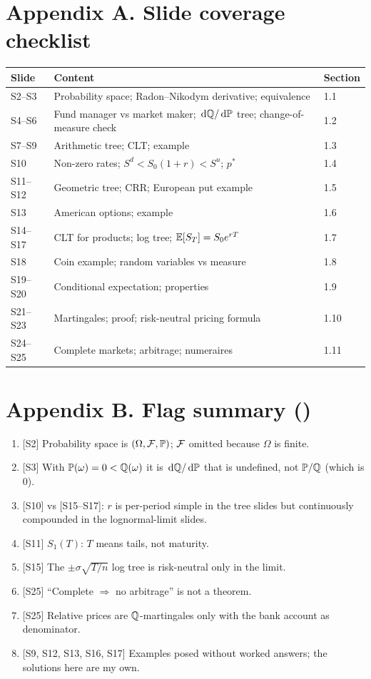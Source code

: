 \documentclass[10pt]{article}
\begin{document}
\section*{Appendix A. Slide coverage checklist}
{\small\begin{tabularx}{\linewidth}{@{}l X l@{}}\toprule
Slide & Content & Section\\\midrule
S2--S3 & Probability space; Radon--Nikodym derivative; equivalence & 1.1\\
S4--S6 & Fund manager vs market maker; $\,\mathrm{d}\mathbb{Q}/\,\mathrm{d}\mathbb{P}$ tree; change-of-measure check & 1.2\\
S7--S9 & Arithmetic tree; CLT; example & 1.3\\
S10 & Non-zero rates; $S^d<S_0(1+r)<S^u$; $p^*$ & 1.4\\
S11--S12 & Geometric tree; CRR; European put example & 1.5\\
S13 & American options; example & 1.6\\
S14--S17 & CLT for products; log tree; $\mathbb{E}[S_T]=S_0e^{rT}$ & 1.7\\
S18 & Coin example; random variables vs measure & 1.8\\
S19--S20 & Conditional expectation; properties & 1.9\\
S21--S23 & Martingales; proof; risk-neutral pricing formula & 1.10\\
S24--S25 & Complete markets; arbitrage; numeraires & 1.11\\\bottomrule
\end{tabularx}}

\section*{Appendix B. Flag summary (\flag)}
\begin{enumerate}
\item {}[S2] Probability space is $(\Omega,\mathcal{F},\mathbb{P})$; $\mathcal{F}$ omitted because $\Omega$ is finite.
\item {}[S3] With $\mathbb{P}(\omega)=0<\mathbb{Q}(\omega)$ it is $\,\mathrm{d}\mathbb{Q}/\,\mathrm{d}\mathbb{P}$ that is undefined, not $\mathbb{P}/\mathbb{Q}$ (which is 0).
\item {}[S10] vs [S15--S17]: $r$ is per-period simple in the tree slides but continuously compounded in the lognormal-limit slides.
\item {}[S11] $S_1(T)$: $T$ means tails, not maturity.
\item {}[S15] The $\pm\sigma\sqrt{T/n}$ log tree is risk-neutral only in the limit.
\item {}[S25] ``Complete $\Rightarrow$ no arbitrage'' is not a theorem.
\item {}[S25] Relative prices are $\mathbb{Q}$-martingales only with the bank account as denominator.
\item {}[S9, S12, S13, S16, S17] Examples posed without worked answers; the solutions here are my own.
\end{enumerate}
\end{document}
